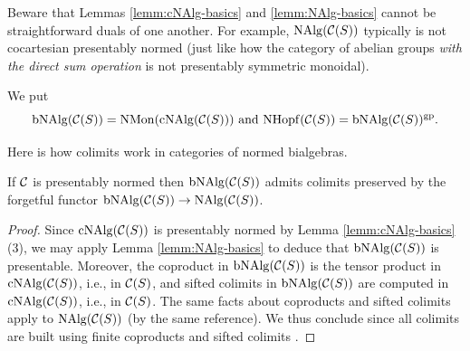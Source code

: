 \documentclass{amsart}
\numberwithin{proposition}{section}
\numberwithin{equation}{section}
\def\NMon{\mathrm{NMon}}
\def\NHopf{\mathrm{NHopf}}
\def\cNAlg{\mathrm{cNAlg}}
\def\bNAlg{\mathrm{bNAlg}}
\begin{document}
\begin{remark}
Beware that Lemmas \ref{lemm:cNAlg-basics} and \ref{lemm:NAlg-basics} cannot be straightforward duals of one another.
For example, $\mathrm{NAlg}(\mathcal C(S))$ typically is not cocartesian presentably normed (just like how the category of abelian groups \emph{with the direct sum operation} is not presentably symmetric monoidal).
\end{remark}

\begin{definition}
We put \[ \bNAlg(\scr C(S)) = \NMon(\cNAlg(\scr C(S))) \text{ and } \NHopf(\scr C(S)) = \bNAlg(\scr C(S))^\gp. \]
\end{definition}

Here is how colimits work in categories of normed bialgebras.
\begin{lemma} \label{lemm:colim-in-bNAlg}
If $\mathcal C$ is presentably normed then $\bNAlg(\scr C(S))$ admits colimits preserved by the forgetful functor $\bNAlg(\scr C(S)) \to \NAlg(\scr C(S))$.
\end{lemma}
\begin{proof}
Since $\cNAlg(\scr C(S))$ is presentably normed by Lemma \ref{lemm:cNAlg-basics}(3), we may apply Lemma \ref{lemm:NAlg-basics} to deduce that $\bNAlg(\scr C(S))$ is presentable.
Moreover, the coproduct in $\bNAlg(\scr C(S))$ is the tensor product in $\cNAlg(\scr C(S))$, i.e., in $\mathcal C(S)$, and sifted colimits in $\bNAlg(\scr C(S))$ are computed in $\cNAlg(\scr C(S))$, i.e., in $\mathcal C(S)$.
The same facts about coproducts and sifted colimits apply to $\mathrm{NAlg}(\mathcal C(S))$ (by the same reference).
We thus conclude since all colimits are built using finite coproducts and sifted colimits \cite[Lemma~2.8]{bachmann-norms}.
\end{proof}
\end{document}
